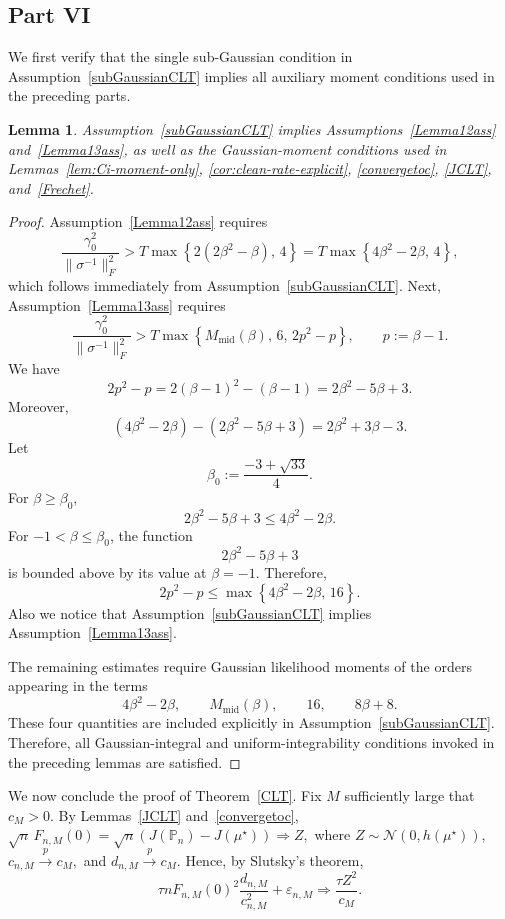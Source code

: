 \documentclass[11pt]{article}
\newtheorem{lemma}{Lemma}
\theoremstyle{definition}
\begin{document}
\subsection{Part VI}

We first verify that the single sub-Gaussian condition in
Assumption~\ref{subGaussianCLT} implies all auxiliary moment
conditions used in the preceding parts.

\begin{lemma}\label{lem:section5-assumptions}
Assumption~\ref{subGaussianCLT} implies
Assumptions~\ref{Lemma12ass} and~\ref{Lemma13ass}, as well as the
Gaussian-moment conditions used in
Lemmas~\ref{lem:Ci-moment-only},
\ref{cor:clean-rate-explicit},
\ref{convergetoc},
\ref{JCLT}, and~\ref{Frechet}.
\end{lemma}

\begin{proof}
Assumption~\ref{Lemma12ass} requires
\[
\frac{\gamma_0^2}{\|\sigma^{-1}\|_F^2}
>
T\max\left\{
2(2\beta^2-\beta),\,4
\right\}
=
T\max\left\{
4\beta^2-2\beta,\,4
\right\},
\]
which follows immediately from
Assumption~\ref{subGaussianCLT}.
Next, Assumption~\ref{Lemma13ass} requires
\[
\frac{\gamma_0^2}{\|\sigma^{-1}\|_F^2}
>
T\max\left\{
M_{\mathrm{mid}}(\beta),\,
6,\,
2p^2-p
\right\},
\qquad
p:=\beta-1.
\]
We have
\[
2p^2-p
=
2(\beta-1)^2-(\beta-1)
=
2\beta^2-5\beta+3.
\]
Moreover,
\[
(4\beta^2-2\beta)
-
(2\beta^2-5\beta+3)
=
2\beta^2+3\beta-3.
\]
Let
\[
\beta_0
:=
\frac{-3+\sqrt{33}}{4}.
\]
For $\beta\geq\beta_0$,
\[
2\beta^2-5\beta+3
\leq
4\beta^2-2\beta.
\]
For $-1<\beta\leq\beta_0$, the function
\[
2\beta^2-5\beta+3
\]
is bounded above by its value at $\beta=-1$.
Therefore,
\[
2p^2-p
\leq
\max\left\{
4\beta^2-2\beta,\,
16
\right\}.
\]
Also we notice that
Assumption~\ref{subGaussianCLT} implies
Assumption~\ref{Lemma13ass}.

The remaining estimates require Gaussian likelihood moments of the
orders appearing in the terms
\[
4\beta^2-2\beta,
\qquad
M_{\mathrm{mid}}(\beta),
\qquad
16,
\qquad
8\beta+8.
\]
These four quantities are included explicitly in
Assumption~\ref{subGaussianCLT}. Therefore, all Gaussian-integral and
uniform-integrability conditions invoked in the preceding lemmas are
satisfied.
\end{proof}

We now conclude the proof of Theorem~\ref{CLT}. Fix $M$ sufficiently
large that $c_M>0.$
By Lemmas~\ref{JCLT} and~\ref{convergetoc}, $\sqrt n\,F_{n,M}(0)
=
\sqrt n
\left(
J(\mathbb P_n)-J(\mu^\star)
\right)
\Rightarrow
Z,$
where $Z\sim\mathcal N\!\left(0,h(\mu^\star)\right),$ $c_{n,M}\xrightarrow{p}c_M,$ and $d_{n,M}\xrightarrow{p}c_M.$
Hence, by Slutsky's theorem,
\[
\tau nF_{n,M}(0)^2
\frac{d_{n,M}}{c_{n,M}^2}
+
\varepsilon_{n,M}
\Rightarrow
\frac{\tau Z^2}{c_M}.
\]
\end{document}
